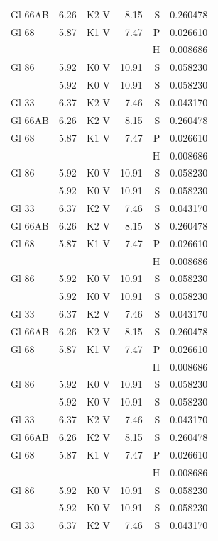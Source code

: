 \documentclass{aa}
\begin{document}
{\begin{longtable}{lllrrr}
Gl 66AB  & 6.26 & K2 V & 8.15 & S & 0.260478\\
Gl 68    & 5.87 & K1 V & 7.47 & P & 0.026610\\
         &      &      &      & H & 0.008686\\
Gl 86    & 5.92 & K0 V & 10.91& S & 0.058230\\            & 5.92 & K0 V & 10.91& S & 0.058230\\
Gl 33    & 6.37 & K2 V & 7.46 & S & 0.043170\\
Gl 66AB  & 6.26 & K2 V & 8.15 & S & 0.260478\\
Gl 68    & 5.87 & K1 V & 7.47 & P & 0.026610\\
         &      &      &      & H & 0.008686\\
Gl 86    & 5.92 & K0 V & 10.91& S & 0.058230\\
         & 5.92 & K0 V & 10.91& S & 0.058230\\
Gl 33    & 6.37 & K2 V & 7.46 & S & 0.043170\\
Gl 66AB  & 6.26 & K2 V & 8.15 & S & 0.260478\\
Gl 68    & 5.87 & K1 V & 7.47 & P & 0.026610\\
         &      &      &      & H & 0.008686\\
Gl 86    & 5.92 & K0 V & 10.91& S & 0.058230\\            & 5.92 & K0 V & 10.91& S & 0.058230\\
Gl 33    & 6.37 & K2 V & 7.46 & S & 0.043170\\
Gl 66AB  & 6.26 & K2 V & 8.15 & S & 0.260478\\
Gl 68    & 5.87 & K1 V & 7.47 & P & 0.026610\\
         &      &      &      & H & 0.008686\\
Gl 86    & 5.92 & K0 V & 10.91& S & 0.058230\\
         & 5.92 & K0 V & 10.91& S & 0.058230\\
Gl 33    & 6.37 & K2 V & 7.46 & S & 0.043170\\
Gl 66AB  & 6.26 & K2 V & 8.15 & S & 0.260478\\
Gl 68    & 5.87 & K1 V & 7.47 & P & 0.026610\\
         &      &      &      & H & 0.008686\\
Gl 86    & 5.92 & K0 V & 10.91& S & 0.058230\\            & 5.92 & K0 V & 10.91& S & 0.058230\\
Gl 33    & 6.37 & K2 V & 7.46 & S & 0.043170\\

\end{longtable}}
\end{document}
